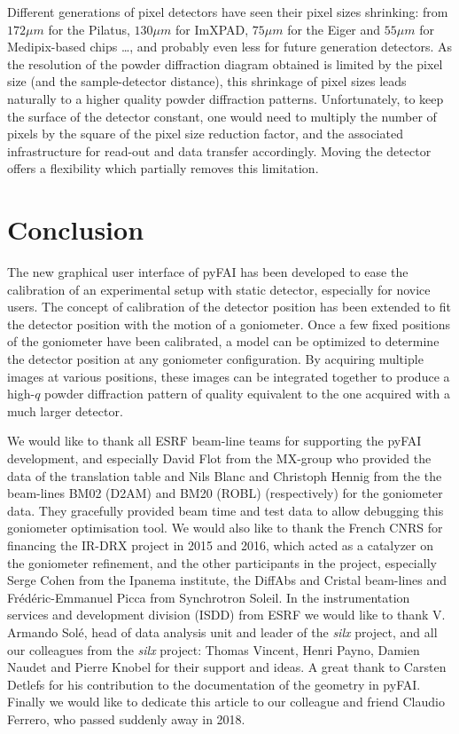 \documentclass[preprint]{iucr}              %
\begin{document}
Different generations of pixel detectors have seen their pixel sizes
shrinking:
from $172 \mu m$ for the Pilatus, $130 \mu m$ for ImXPAD, $75 \mu m$ for the
Eiger and $55 \mu m$ for Medipix-based chips \ldots, and probably even less for
future generation detectors.
As the resolution of the powder diffraction diagram obtained is limited by the
pixel size (and the sample-detector distance), this shrinkage of
pixel sizes leads naturally to a higher quality powder
diffraction patterns.
Unfortunately, to keep the surface of the detector constant, one would need
to multiply the number of pixels by the square of the pixel size reduction
factor, and the associated infrastructure for read-out and data transfer
accordingly.
Moving the detector offers a flexibility which partially removes this
limitation.

\section{Conclusion}

The new graphical user interface of pyFAI has been developed to ease the
calibration of an experimental setup with static detector, especially for
novice users.
The concept of calibration of the detector position has been extended to fit
the detector position with the motion of a goniometer.   
Once a few fixed positions of the goniometer have been calibrated, a model can
be optimized to determine the detector position at any goniometer
configuration.
By acquiring multiple images at various positions, these images can be
integrated together to produce a high-$q$ powder diffraction pattern of
quality equivalent to the one acquired with a much larger detector. 
 

We would like to thank all ESRF beam-line teams for supporting the
pyFAI development, and especially David Flot from the MX-group who provided the
data of the translation table and Nils Blanc and Christoph Hennig from the the
beam-lines BM02 (D2AM) and BM20 (ROBL) (respectively) for the goniometer data. 
They gracefully provided beam time and test data to allow debugging this 
goniometer optimisation tool.
We would also like to thank the French CNRS for financing the IR-DRX project
in 2015 and 2016, which acted as a catalyzer on the goniometer refinement,
and the other participants in the project, especially Serge Cohen from the
Ipanema institute, the DiffAbs and Cristal beam-lines and Frédéric-Emmanuel Picca 
from Synchrotron Soleil.
In the instrumentation services and development division (ISDD) from ESRF  we
would like to thank V. Armando Solé, head of data analysis unit and leader of 
the \textit{silx} project, and all our colleagues from the \textit{silx}
project:
Thomas Vincent, Henri Payno, Damien Naudet and  Pierre Knobel for their support and ideas. 
A great thank to Carsten Detlefs for his contribution to the documentation of the geometry in pyFAI. 
Finally we would like to dedicate this article to our colleague and friend Claudio Ferrero, who passed suddenly away in 2018. 



\end{document}
